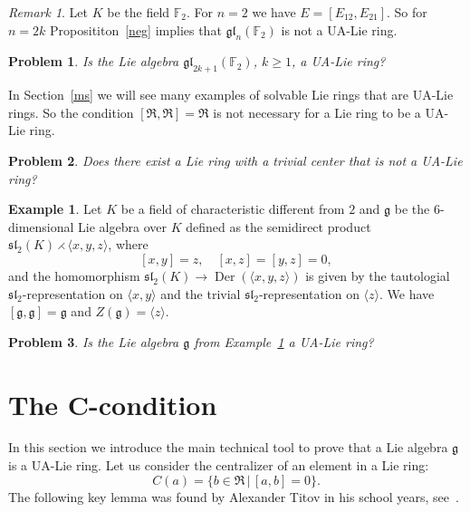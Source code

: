 \documentclass[a4paper,draft,reqno,12pt]{amsart}
\newtheorem{problem}{Problem}
\theoremstyle{definition}
\newtheorem{example}{Example}
\theoremstyle{remark}
\newtheorem {remark}{Remark}
\DeclareMathOperator{\Der}{Der}
\def\FF{{\mathbb F}}
\def\RRR{\mathfrak{R}}
\def\ggg{\mathfrak{g}}
\def\gl{\mathfrak{gl}}
\def\sl{\mathfrak{sl}}
\renewcommand{\ge}{\geqslant}
\begin{document}
\begin{remark}
Let $K$ be the field $\FF_2$. For $n=2$ we have $E=[E_{12},{E_{21}}]$. So for $n=2k$ Proposititon~\ref{neg} implies that $\gl_n(\FF_2)$ is not a UA-Lie ring. 
\end{remark}

\begin{problem}
Is the Lie algebra $\gl_{2k+1}(\FF_2)$, $k\ge 1$, a UA-Lie ring?
\end{problem}

In Section~\ref{ms} we will see many examples of solvable Lie rings that are UA-Lie rings. So the condition $[\RRR,\RRR]=\RRR$ is not necessary for a Lie ring to be a UA-Lie ring. 

\begin{problem}
Does there exist a Lie ring with a trivial center that is not a UA-Lie ring?
\end{problem} 

\begin{example}
\label{exy}
Let $K$ be a field of characteristic different from $2$ and $\ggg$ be the 6-dimensional Lie algebra over $K$ defined as the semidirect product
$\sl_2(K)\rightthreetimes\langle x,y,z\rangle$, where 
$$
[x,y]=z, \quad [x,z]=[y,z]=0, 
$$
and the homomorphism $\sl_2(K)\to\Der(\langle x,y,z\rangle)$ 
is given by the tautologial $\sl_2$-representation on $\langle x,y\rangle$ and the trivial $\sl_2$-representation on $\langle z\rangle$. We have
$[\ggg,\ggg]=\ggg$ and $Z(\ggg)=\langle z\rangle$. 
\end{example} 

\begin{problem}
Is the Lie algebra $\ggg$ from Example~\ref{exy} a UA-Lie ring? 
\end{problem}

\section{The C-condition}
\label{cc}

In this section we introduce the main technical tool to prove that a Lie algebra $\ggg$ is a UA-Lie ring. 
Let us consider the centralizer of an element in a Lie ring: 
$$
C(a)=\{b\in\RRR \, | \, [a,b]=0\}. 
$$
The following key lemma was found by Alexander Titov in his school years, see~\cite[Lemma~2]{AT}. 
\end{document}

